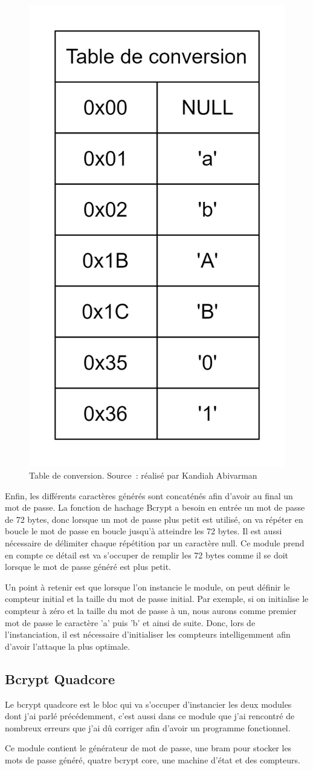 \begin{figure}[tbph!]
	\centering
	\includegraphics[width=0.25\linewidth]{conversion_table}
	\caption[Table de conversion]{Table de conversion. Source : réalisé par Kandiah Abivarman}
	\label{fig:conversion_table}
\end{figure}

Enfin, les différents caractères générés sont concaténés afin d'avoir au final un mot de passe. 
La fonction de hachage Bcrypt a besoin en entrée un mot de passe de 72 bytes, donc lorsque un mot de passe plus petit est utilisé, on va répéter en boucle le mot de passe en boucle jusqu'à atteindre les 72 bytes. 
Il est aussi nécessaire de délimiter chaque répétition par un caractère null. 
Ce module prend en compte ce détail est va s'occuper de remplir les 72 bytes comme il se doit lorsque le mot de passe généré est plus petit.

Un point à retenir est que lorsque l'on instancie le module, on peut définir le compteur initial et la taille du mot de passe initial. 
Par exemple, si on initialise le compteur à zéro et la taille du mot de passe à un, nous aurons comme premier mot de passe le caractère 'a' puis 'b' et ainsi de suite. 
Donc, lors de l'instanciation, il est nécessaire d'initialiser les compteurs intelligemment afin d'avoir l'attaque la plus optimale.

\subsection{Bcrypt Quadcore}

Le bcrypt quadcore est le bloc qui va s'occuper d'instancier les deux modules dont j'ai parlé précédemment, c'est aussi dans ce module que j'ai rencontré de nombreux erreurs que j'ai dû corriger afin d'avoir un programme fonctionnel.

Ce module contient le générateur de mot de passe, une \gls{bram} pour stocker les mots de passe généré, quatre bcrypt core, une machine d'état et des compteurs.

